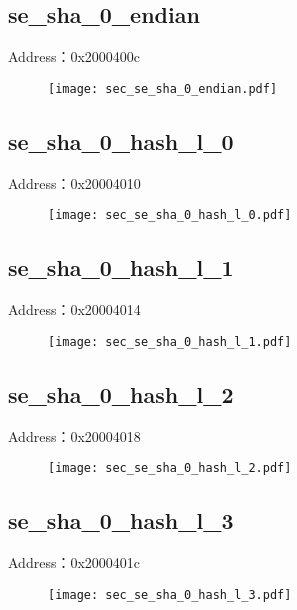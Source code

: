 \subsection{se\_sha\_0\_endian}
\label{sec-se-sha-0-endian}
Address：0x2000400c
 \begin{figure}[H]
\texttt{[image: sec\_se\_sha\_0\_endian.pdf]}
\end{figure}

\subsection{se\_sha\_0\_hash\_l\_0}
\label{sec-se-sha-0-hash-l-0}
Address：0x20004010
 \begin{figure}[H]
\texttt{[image: sec\_se\_sha\_0\_hash\_l\_0.pdf]}
\end{figure}

\subsection{se\_sha\_0\_hash\_l\_1}
\label{sec-se-sha-0-hash-l-1}
Address：0x20004014
 \begin{figure}[H]
\texttt{[image: sec\_se\_sha\_0\_hash\_l\_1.pdf]}
\end{figure}

\subsection{se\_sha\_0\_hash\_l\_2}
\label{sec-se-sha-0-hash-l-2}
Address：0x20004018
 \begin{figure}[H]
\texttt{[image: sec\_se\_sha\_0\_hash\_l\_2.pdf]}
\end{figure}

\subsection{se\_sha\_0\_hash\_l\_3}
\label{sec-se-sha-0-hash-l-3}
Address：0x2000401c
 \begin{figure}[H]
\texttt{[image: sec\_se\_sha\_0\_hash\_l\_3.pdf]}
\end{figure}

